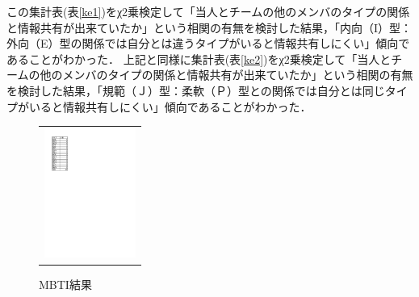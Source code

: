 \documentclass[uplatex]{jsarticle}
\begin{document}
この集計表(表\ref{ke1})をχ2乗検定して「当人とチームの他のメンバのタイプの関係と情報共有が出来ていたか」という相関の有無を検討した結果，「内向（I）型：外向（E）型の関係では自分とは違うタイプがいると情報共有しにくい」傾向であることがわかった．
上記と同様に集計表(表\ref{ke2})をχ2乗検定して「当人とチームの他のメンバのタイプの関係と情報共有が出来ていたか」という相関の有無を検討した結果，「規範（Ｊ）型：柔軟（Ｐ）型との関係では自分とは同じタイプがいると情報共有しにくい」傾向であることがわかった．
\begin{figure}[h]
   \begin{tabular}{c}

      \begin{minipage}{0.33\hsize}
        \begin{center}
   \includegraphics[width=3cm,clip]{wariai.pdf}
  \caption{MBTI結果}
  \label{wariai}
  \end{center}
 \end{minipage}


\end{tabular}
\end{figure}
\end{document}
